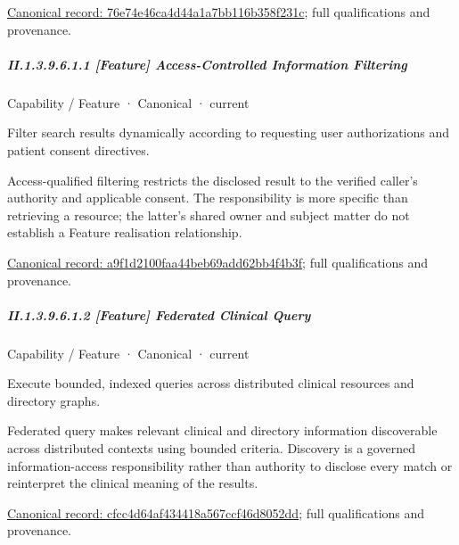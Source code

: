 {\footnotesize \href{../../../../../../../continuum/strategy/capability/76e74e46ca4d44a1a7bb116b358f231c.md}{Canonical record: 76e74e46ca4d44a1a7bb116b358f231c}; full qualifications and provenance.}\par
\subparagraph*{II.1.3.9.6.1.1 [Feature] Access-Controlled Information Filtering}
\label{navigation:II.1.3.9.6.1.1}

\label{element:a9f1d2100faa44beb69add62bb4f4b3f}
{\small Capability / Feature · Canonical · current}\par

Filter search results dynamically according to requesting user authorizations and patient consent directives.



Access-qualified filtering restricts the disclosed result to the verified caller's authority and applicable consent. The responsibility is more specific than retrieving a resource; the latter's shared owner and subject matter do not establish a Feature realisation relationship.


{\footnotesize \href{../../../../../../../continuum/strategy/capability/feature/a9f1d2100faa44beb69add62bb4f4b3f.md}{Canonical record: a9f1d2100faa44beb69add62bb4f4b3f}; full qualifications and provenance.}\par
\subparagraph*{II.1.3.9.6.1.2 [Feature] Federated Clinical Query}
\label{navigation:II.1.3.9.6.1.2}

\label{element:cfcc4d64af434418a567ccf46d8052dd}
{\small Capability / Feature · Canonical · current}\par

Execute bounded, indexed queries across distributed clinical resources and directory graphs.



Federated query makes relevant clinical and directory information discoverable across distributed contexts using bounded criteria. Discovery is a governed information-access responsibility rather than authority to disclose every match or reinterpret the clinical meaning of the results.


{\footnotesize \href{../../../../../../../continuum/strategy/capability/feature/cfcc4d64af434418a567ccf46d8052dd.md}{Canonical record: cfcc4d64af434418a567ccf46d8052dd}; full qualifications and provenance.}\par
